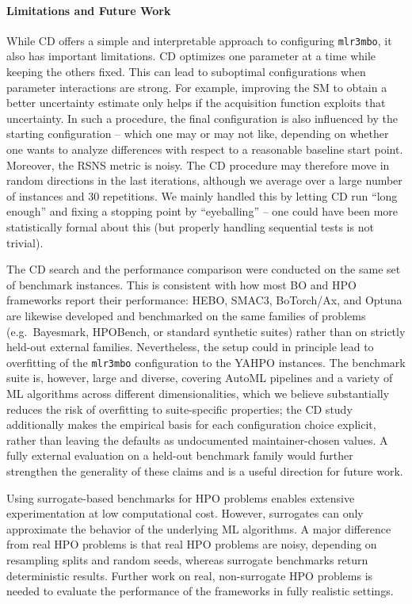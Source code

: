 \documentclass[12pt,letterpaper]{article}
\begin{document}
\paragraph{Limitations and Future Work}
While CD offers a simple and interpretable approach to configuring \texttt{mlr3mbo}, it also has important limitations.
CD optimizes one parameter at a time while keeping the others fixed.
This can lead to suboptimal configurations when parameter interactions are strong.
For example, improving the SM to obtain a better uncertainty estimate only helps if the acquisition function exploits that uncertainty.
In such a procedure, the final configuration is also influenced by the starting configuration -- which one may or may not like, depending on whether one wants to analyze differences with respect to a reasonable baseline start point.
Moreover, the RSNS metric is noisy. 
The CD procedure may therefore move in random directions in the last iterations, although we
average over a large number of instances and 30 repetitions. 
We mainly handled this by letting CD run ``long enough'' and fixing a stopping point by ``eyeballing'' -- one could have been more statistically formal about this (but properly handling sequential tests is not trivial). 

The CD search and the performance comparison were conducted on the same set of benchmark instances.
This is consistent with how most BO and HPO frameworks report their performance: HEBO\cite{cowen-rivers2022}, SMAC3\cite{lindauer2022}, BoTorch/Ax\cite{balandat2020}, and Optuna\cite{akiba2019} are likewise developed and benchmarked on the same families of problems (e.g.\ Bayesmark, HPOBench, or standard synthetic suites) rather than on strictly held-out external families.
Nevertheless, the setup could in principle lead to overfitting of the \texttt{mlr3mbo} configuration to the YAHPO instances.
The benchmark suite is, however, large and diverse, covering AutoML pipelines and a variety of ML algorithms across different dimensionalities, which we believe substantially reduces the risk of overfitting to suite-specific properties; the CD study additionally makes the empirical basis for each configuration choice explicit, rather than leaving the defaults as undocumented maintainer-chosen values.
A fully external evaluation on a held-out benchmark family would further strengthen the generality of these claims and is a useful direction for future work.

Using surrogate-based benchmarks for HPO problems enables extensive experimentation at low computational cost.
However, surrogates can only approximate the behavior of the underlying ML algorithms.
A major difference from real HPO problems is that real HPO problems are noisy, depending on resampling splits and random seeds, whereas surrogate benchmarks return deterministic results. 
Further work on real, non-surrogate HPO problems is needed to evaluate the performance of the frameworks in fully realistic settings.
\end{document}
